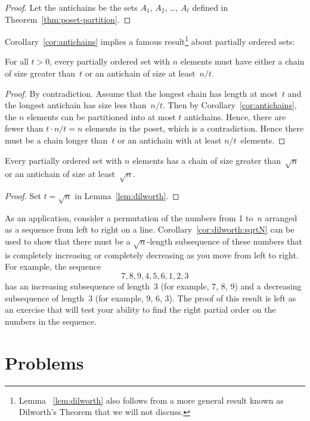 \begin{proof}
Let the antichains be the sets $A_1$, $A_2$, \dots, $A_t$ defined in
Theorem~\ref{thm:poset-partition}.
\end{proof}

Corollary~\ref{cor:antichains} implies a famous result\footnote{Lemma
  ~\ref{lem:dilworth} also follows from a more general result known as
  Dilworth's Theorem that we will not discuss.} about partially
ordered sets:

\begin{lemma}[Dilworth]\label{lem:dilworth}
For all $t > 0$, every partially ordered set with $n$ elements must
have either a chain of size greater than~$t$ or an antichain of size
at least~$n/t$.
\end{lemma}

\begin{proof}
By contradiction.  Assume that the longest chain has length at
most~$t$ and the longest antichain has size less than~$n/t$.  Then by
Corollary~\ref{cor:antichains}, the $n$ elements can be partitioned
into at most $t$ antichains.  Hence, there are fewer than $t \cdot n/t
= n$ elements in the poset, which is a contradiction.  Hence there
must be a chain longer than~$t$ or an antichain with at least
$n/t$~elements.
\end{proof}

\begin{corollary}\label{cor:dilworth:sqrtN}
Every partially ordered set with $n$ elements has a chain of size
greater than~$\sqrt{n}$ or an antichain of size at least~$\sqrt{n}$.
\end{corollary}

\begin{proof}
Set $t = \sqrt{n}$ in Lemma~\ref{lem:dilworth}.
\end{proof}

As an application, consider a permutation of the numbers from 1 to~$n$
arranged as a sequence from left to right on a line.
Corollary~\ref{cor:dilworth:sqrtN} can be used to show that there must
be a $\sqrt{n}$-length subsequence of these numbers that is completely
increasing or completely decreasing as you move from left to right.
For example, the sequence
\begin{equation*}
    7, 8, 9, 4, 5, 6, 1, 2, 3
\end{equation*}
has an increasing subsequence of length~3 (for example, 7, 8, 9) and a
decreasing subsequence of length~3 (for example, 9, 6, 3).  The proof
of this result is left as an exercise that will test your ability to
find the right partial order on the numbers in the sequence.

\section{Problems}

\endinput
